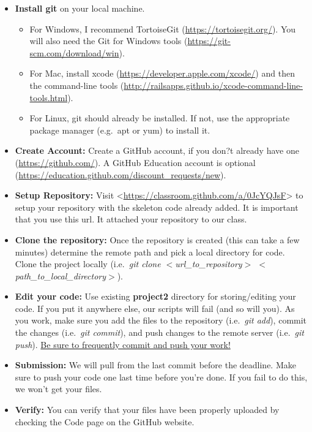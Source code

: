 \documentclass[a4paper,12pt]{article}
\begin{document}
\begin{itemize}
\item \textbf{Install git} on your local machine. 
\begin{itemize}
\item For Windows, I recommend TortoiseGit (\url{https://tortoisegit.org/}). You will also need the Git for Windows tools (\url{https://git-scm.com/download/win}).
\item For Mac, install xcode (\url{https://developer.apple.com/xcode/}) and then the command-line tools (\url{http://railsapps.github.io/xcode-command-line-tools.html}). 
\item For Linux, git should already be installed. If not, use the appropriate package manager (e.g.\ apt or yum) to install it.
\end{itemize}

\item \textbf{Create Account:} Create a GitHub account, if you don?t already have one (\url{https://github.com/}). A GitHub Education account is optional (\url{https://education.github.com/discount_requests/new}).

\item \textbf{Setup Repository:} Visit <\url{https://classroom.github.com/a/0JcYQJsF}> to setup your repository with the skeleton code already added. It is important that you use this url. It attached your repository to our class.


\item \textbf{Clone the repository:} Once the repository is created (this can take a few minutes) determine the remote path and pick a local directory for code. Clone the project locally (i.e.\ \textit{git clone $<$url\_to\_repository$>$ $<$path\_to\_local\_directory$>$}).

\item \textbf{Edit your code:} Use existing \textbf{project2} directory for storing/editing your code. If you put it anywhere else, our scripts will fail (and so will you). As you work, make sure you add the files to the repository (i.e.\ \textit{git add}), commit the changes (i.e.\ \textit{git commit}), and push changes to the remote server (i.e.\ \textit{git push}). \underline{Be sure to frequently commit and push your work!}

\item \textbf{Submission:} We will pull from the last commit before the deadline. Make sure to push your code one last time before you're done. If you fail to do this, we won't get your files.  

\item \textbf{Verify:} You can verify that your files have been properly uploaded by checking the Code page on the GitHub website.

\end{itemize}
\end{document}
